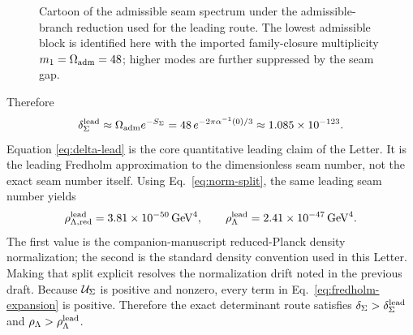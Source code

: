 \begin{figure}[t]
\centering
{}
\caption{Cartoon of the admissible seam spectrum under the admissible-branch reduction used for the leading route. The lowest admissible block is identified here with the imported family-closure multiplicity $m_1=\Omega_{\mathrm{adm}}=48$; higher modes are further suppressed by the seam gap.}
\label{fig:seam-spectrum}
\end{figure}

Therefore
\begin{equation}
\delta_{\Sigma}^{\mathrm{lead}}
\approx
\Omega_{\mathrm{adm}} e^{-S_{\Sigma}}
=
48\,e^{-2\pi\alpha^{-1}(0)/3}
\approx
1.085\times10^{-123}.
\label{eq:delta-lead}
\end{equation}
Equation \eqref{eq:delta-lead} is the core quantitative leading claim of the Letter. It is the leading Fredholm approximation to the dimensionless seam number, not the exact seam number itself. Using Eq.~\eqref{eq:norm-split}, the same leading seam number yields
\begin{equation}
\rho_{\Lambda,\mathrm{red}}^{\mathrm{lead}}
=
3.81\times10^{-50}\,\mathrm{GeV}^4,
\qquad
\rho_{\Lambda}^{\mathrm{lead}}
=
2.41\times10^{-47}\,\mathrm{GeV}^4.
\label{eq:lead-densities}
\end{equation}
The first value is the companion-manuscript reduced-Planck density normalization; the second is the standard density convention used in this Letter. Making that split explicit resolves the normalization drift noted in the previous draft. Because $\mathcal U_{\Sigma}$ is positive and nonzero, every term in Eq.~\eqref{eq:fredholm-expansion} is positive. Therefore the exact determinant route satisfies $\delta_{\Sigma}>\delta_{\Sigma}^{\mathrm{lead}}$ and $\rho_{\Lambda}>\rho_{\Lambda}^{\mathrm{lead}}$.

